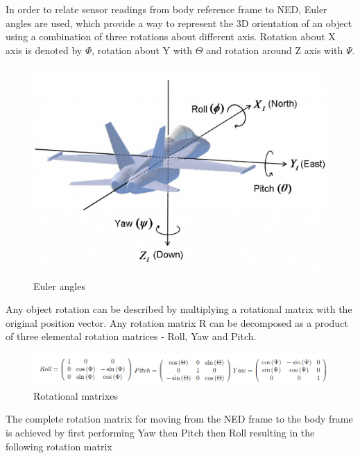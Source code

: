 In order to relate sensor readings from body reference frame to NED, Euler angles are used, which provide a way to represent the 3D orientation of an object using a combination of three rotations about different axis. Rotation about X axis is denoted by $\Phi$, rotation about Y with $\Theta$ and rotation around Z axis with $\Psi$. 

\begin{figure}[H]
    \begin{center}
    \includegraphics[scale = 0.5]{pictures/IMU/Euler_angles.png}
    \end{center}
    \caption{Euler angles}
    \label{fig:my_label}
\end{figure}

Any object rotation can be described by multiplying a rotational matrix with the original position vector. Any rotation matrix R can be decomposed as a product of three elemental rotation matrices - Roll, Yaw and Pitch.\cite{Rotation}\newline
\begin{figure}[H]
    \begin{center}
    \includegraphics[scale = 0.7]{pictures/IMU/rotational_matrixes.png}
    \end{center}
    \caption{Rotational matrixes}
    \label{fig:my_label}
\end{figure}


The complete rotation matrix for moving from the NED frame to the body frame is achieved by first performing Yaw then Pitch then Roll resulting in the following rotation matrix


